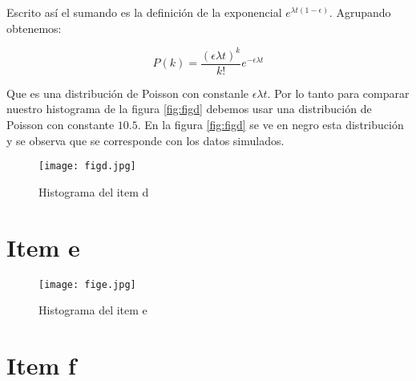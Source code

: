 \documentclass{article}
\begin{document}
Escrito así el sumando es la definición de la exponencial $e^{\lambda t(1- \epsilon)}$.
Agrupando obtenemos:

$$
P(k) = \frac{(\epsilon \lambda t)^k}{k!} e^{-\epsilon \lambda t}
$$

Que es una distribución de Poisson con constanle $\epsilon \lambda t$.
Por lo tanto para comparar nuestro histograma de la figura \ref{fig:figd} debemos usar una distribución de Poisson con constante $10.5$.
En la figura \ref{fig:figd} se ve en negro esta distribución y se observa que se corresponde con los datos simulados.


\begin{figure}
\centering
\texttt{[image: figd.jpg]}
\caption[]{Histograma del item d}
\label{fig:itemd}
\end{figure}

\section{Item e}
\begin{figure}
\centering
\texttt{[image: fige.jpg]}
\caption[]{Histograma del item e}
\label{fig:iteme}
\end{figure}

\section{Item f}
\end{document}
